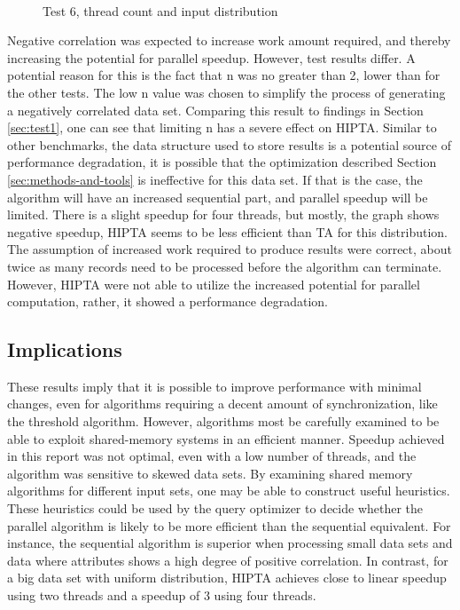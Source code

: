 \begin{figure}[H]
	\centering
	 \qquad
	 \\
	 \qquad
	\caption{Test 6, thread count and input distribution}
	\label{fig:test6}
\end{figure}

Negative correlation was expected to increase work amount required,
and thereby increasing the potential for parallel speedup. However,
test results differ. A potential reason for this is the fact that n
was no greater than 2, lower than for the other tests. The low n value
was chosen to simplify the process of generating a negatively
correlated data set. Comparing this result to findings in Section
\ref{sec:test1}, one can see that limiting n has a severe effect on
HIPTA. Similar to other benchmarks, the data structure used to store
results is a potential source of performance degradation, it is
possible that the optimization described Section
\ref{sec:methods-and-tools} is ineffective for this data set. If that
is the case, the algorithm will have an increased sequential part, and
parallel speedup will be limited. There is a slight speedup for four
threads, but mostly, the graph shows negative speedup, HIPTA seems to
be less efficient than TA for this distribution. The assumption of
increased work required to produce results were correct, about twice
as many records need to be processed before the algorithm can
terminate. However, HIPTA were not able to utilize the increased
potential for parallel computation, rather, it showed a performance
degradation.

\subsection{Implications}

These results imply that it is possible to improve performance with
minimal changes, even for algorithms requiring a decent amount of
synchronization, like the threshold algorithm. However, algorithms
most be carefully examined to be able to exploit shared-memory systems
in an efficient manner. Speedup achieved in this report was not
optimal, even with a low number of threads, and the algorithm was
sensitive to skewed data sets. By examining shared memory algorithms
for different input sets, one may be able to construct useful
heuristics. These heuristics could be used by the query optimizer
to decide whether the parallel algorithm is likely to be more
efficient than the sequential equivalent. For instance, the
sequential algorithm is superior when processing small data sets
and data where attributes shows a high degree of positive correlation.
In contrast, for a big data set with uniform distribution, HIPTA
achieves close to linear speedup using two threads and a speedup of 3
using four threads.

